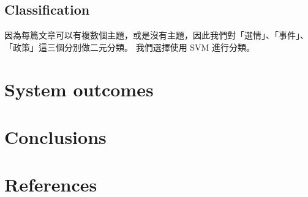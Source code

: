 \documentclass[12pt,cleanfoot,twocolumn]{asme2ej}
\begin{document}
\subsection*{Classification}
因為每篇文章可以有複數個主題，或是沒有主題，因此我們對「選情」、「事件」、「政策」這三個分別做二元分類。
我們選擇使用 SVM 進行分類。


\section{System outcomes}

\section{Conclusions}

\section{References}
\end{document}
